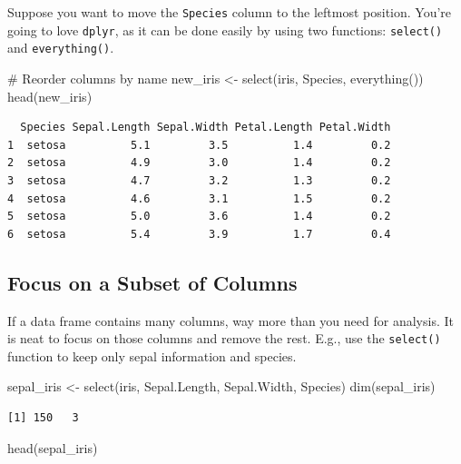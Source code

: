 \documentclass[
  letterpaper,
]{book}
\newenvironment{Shaded}{\begin{snugshade}}{\end{snugshade}}
\newcommand{\CommentTok}[1]{\textcolor[rgb]{0.37,0.37,0.37}{#1}}
\newcommand{\FunctionTok}[1]{\textcolor[rgb]{0.28,0.35,0.67}{#1}}
\newcommand{\NormalTok}[1]{\textcolor[rgb]{0.00,0.23,0.31}{#1}}
\newcommand{\OtherTok}[1]{\textcolor[rgb]{0.00,0.23,0.31}{#1}}
\begin{document}
Suppose you want to move the \texttt{Species} column to the leftmost
position. You're going to love \texttt{dplyr}, as it can be done easily
by using two functions: \texttt{select()} and \texttt{everything()}.

\begin{Shaded}
\begin{Highlighting}[]
\CommentTok{\# Reorder columns by name}
\NormalTok{new\_iris }\OtherTok{\textless{}{-}} \FunctionTok{select}\NormalTok{(iris, Species, }\FunctionTok{everything}\NormalTok{())}
\FunctionTok{head}\NormalTok{(new\_iris)}
\end{Highlighting}
\end{Shaded}

\begin{verbatim}
  Species Sepal.Length Sepal.Width Petal.Length Petal.Width
1  setosa          5.1         3.5          1.4         0.2
2  setosa          4.9         3.0          1.4         0.2
3  setosa          4.7         3.2          1.3         0.2
4  setosa          4.6         3.1          1.5         0.2
5  setosa          5.0         3.6          1.4         0.2
6  setosa          5.4         3.9          1.7         0.4
\end{verbatim}

\subsection{Focus on a Subset of
Columns}\label{focus-on-a-subset-of-columns-1}

If a data frame contains many columns, way more than you need for
analysis. It is neat to focus on those columns and remove the rest.
E.g., use the \texttt{select()} function to keep only sepal information
and species.

\begin{Shaded}
\begin{Highlighting}[]
\NormalTok{sepal\_iris }\OtherTok{\textless{}{-}} \FunctionTok{select}\NormalTok{(iris, Sepal.Length, Sepal.Width, Species)}
\FunctionTok{dim}\NormalTok{(sepal\_iris)}
\end{Highlighting}
\end{Shaded}

\begin{verbatim}
[1] 150   3
\end{verbatim}

\begin{Shaded}
\begin{Highlighting}[]
\FunctionTok{head}\NormalTok{(sepal\_iris)}
\end{Highlighting}
\end{Shaded}
\end{document}
